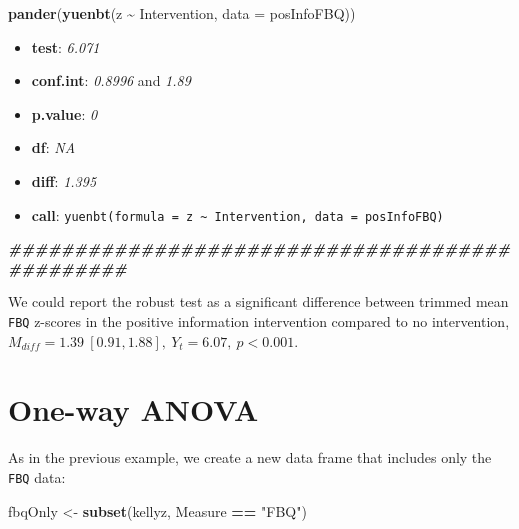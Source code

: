 \documentclass[
]{article}
\newenvironment{Shaded}{\begin{snugshade}}{\end{snugshade}}
\newcommand{\AttributeTok}[1]{\textcolor[rgb]{0.13,0.29,0.53}{#1}}
\newcommand{\DocumentationTok}[1]{\textcolor[rgb]{0.56,0.35,0.01}{\textbf{\textit{#1}}}}
\newcommand{\FunctionTok}[1]{\textcolor[rgb]{0.13,0.29,0.53}{\textbf{#1}}}
\newcommand{\NormalTok}[1]{#1}
\newcommand{\OtherTok}[1]{\textcolor[rgb]{0.56,0.35,0.01}{#1}}
\newcommand{\SpecialCharTok}[1]{\textcolor[rgb]{0.81,0.36,0.00}{\textbf{#1}}}
\newcommand{\StringTok}[1]{\textcolor[rgb]{0.31,0.60,0.02}{#1}}
\providecommand{\tightlist}{%
  \setlength{\itemsep}{0pt}\setlength{\parskip}{0pt}}
\begin{document}
\begin{Shaded}
\begin{Highlighting}[]
    \FunctionTok{pander}\NormalTok{(}\FunctionTok{yuenbt}\NormalTok{(z }\SpecialCharTok{\textasciitilde{}}\NormalTok{ Intervention, }\AttributeTok{data =}\NormalTok{ posInfoFBQ))}
\end{Highlighting}
\end{Shaded}

\begin{itemize}
\tightlist
\item
  \textbf{test}: \emph{6.071}
\item
  \textbf{conf.int}: \emph{0.8996} and \emph{1.89}
\item
  \textbf{p.value}: \emph{0}
\item
  \textbf{df}: \emph{NA}
\item
  \textbf{diff}: \emph{1.395}
\item
  \textbf{call}: \texttt{yuenbt(formula\ =\ z\ \textasciitilde{}\ Intervention,\ data\ =\ posInfoFBQ)}
\end{itemize}

\begin{Shaded}
\begin{Highlighting}[]
    \DocumentationTok{\#\#\#\#\#\#\#\#\#\#\#\#\#\#\#\#\#\#\#\#\#\#\#\#\#\#\#\#\#\#\#\#\#\#\#\#\#\#\#\#\#\#\#\#\#\#\#}
\end{Highlighting}
\end{Shaded}

We could report the robust test as a significant difference between trimmed mean \texttt{FBQ} z-scores in the positive information intervention compared to no intervention, \(M_{diff} = 1.39 \ [0.91, 1.88], \ Y_t = 6.07, \ p < 0.001\).

\section*{One-way ANOVA}\label{one-way-anova}

As in the previous example, we create a new data frame that includes only the \texttt{FBQ} data:

\begin{Shaded}
\begin{Highlighting}[]
\NormalTok{    fbqOnly }\OtherTok{\textless{}{-}} \FunctionTok{subset}\NormalTok{(kellyz, Measure }\SpecialCharTok{==} \StringTok{"FBQ"}\NormalTok{)}
\end{Highlighting}
\end{Shaded}
\end{document}
